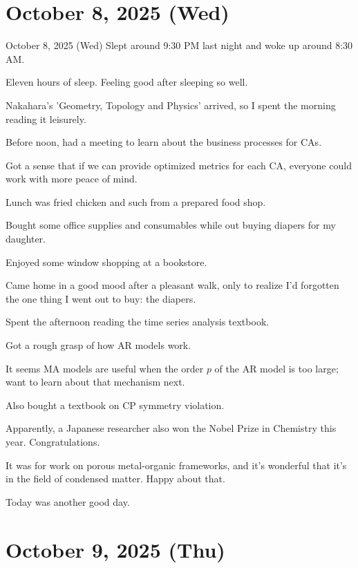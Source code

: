 \documentclass[dvipdfmx, autodetect-engine, aspectratio=169, 10.5pt]{beamer}
\begin{document}
\section{October 8, 2025 (Wed)}

\begin{frame}{October 8, 2025 (Wed)}
\scriptsize
Slept around 9:30 PM last night and woke up around 8:30 AM.

Eleven hours of sleep. Feeling good after sleeping so well.

Nakahara's 'Geometry, Topology and Physics' arrived, so I spent the morning reading it leisurely.

Before noon, had a meeting to learn about the business processes for CAs.

Got a sense that if we can provide optimized metrics for each CA, everyone could work with more peace of mind.

Lunch was fried chicken and such from a prepared food shop.

Bought some office supplies and consumables while out buying diapers for my daughter.

Enjoyed some window shopping at a bookstore.

Came home in a good mood after a pleasant walk, only to realize I'd forgotten the one thing I went out to buy: the diapers.

Spent the afternoon reading the time series analysis textbook.

Got a rough grasp of how AR models work.

It seems MA models are useful when the order $p$ of the AR model is too large; want to learn about that mechanism next.

Also bought a textbook on CP symmetry violation.

Apparently, a Japanese researcher also won the Nobel Prize in Chemistry this year. Congratulations.

It was for work on porous metal-organic frameworks, and it's wonderful that it's in the field of condensed matter. Happy about that.

Today was another good day.
\end{frame}

\section{October 9, 2025 (Thu)}
\end{document}
